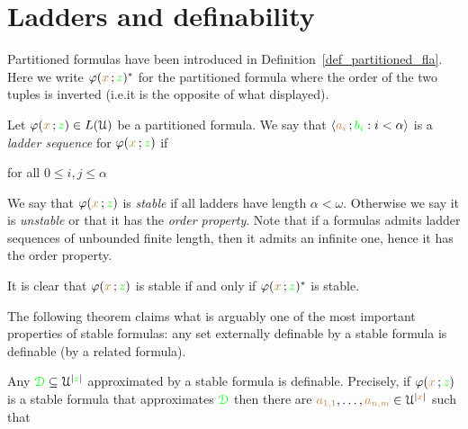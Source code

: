 \documentclass[creche.tex]{subfiles}
\begin{document}
\section{Ladders and definability}

Partitioned formulas have been introduced in Definition~\ref{def_partitioned_fla}. Here we write \emph{$\varphi({\color{brown} x}\,;{\color{green} z})^*$\/} for the partitioned formula where the order of the two tuples is inverted (i.e.\@ it is the opposite of what displayed).

Let $\varphi({\color{brown} x}\,;{\color{green} z})\in L(\EuScript U)$ be a partitioned formula. We say that $\langle{\color{brown}a_i}\,;{\color{green} b_i} : i<\alpha\rangle$ is a \emph{ladder sequence\/} for $\varphi({\color{brown} x}\,;{\color{green} z})$ if 

\hfill for all $0\le i,j\le\alpha$

We say that $\varphi({\color{brown} x}\,;{\color{green} z})$ is \emph{stable\/} if all ladders have length $\alpha<\omega$. Otherwise we say it is \emph{unstable} or that it has the \emph{order property}. 
Note that if a formulas admits ladder sequences of unbounded finite length, then it admits an infinite one, hence it has the order property.

It is clear that $\varphi({\color{brown} x}\,;{\color{green} z})$ is stable if and only if $\varphi({\color{brown} x}\,;{\color{green} z})^*$ is stable.


The following theorem claims what is arguably one of the most important properties of stable formulas: any set externally definable by a stable formula is definable (by a related formula).

\begin{theorem}\label{thm_def_stable_formula}
Any ${\color{green}\EuScript D}\subseteq\EuScript U^{|{\color{green} z}|}$ approximated by a stable formula is definable.
Precisely, if $\varphi({\color{brown} x}\,;{\color{green} z})$ is a stable formula that approximates ${\color{green}\EuScript D}$ then there are ${\color{brown} a_{1,1}},\dots,{\color{brown} a_{n,m}}\in\EuScript U^{|{\color{brown} x}|}$ such that 

\end{theorem}
\end{document}
